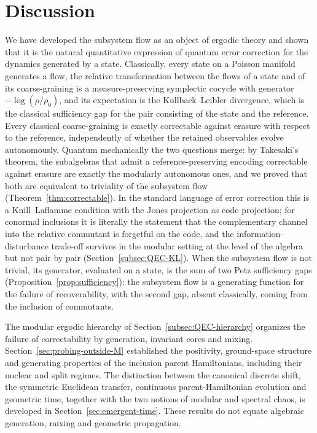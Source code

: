 \documentclass[a4paper,11pt]{article}
\theoremstyle{definition}
\begin{document}
\section{Discussion}\label{sec:discussion}

We have developed the subsystem flow as an object of ergodic theory and shown that it is the natural quantitative expression of quantum error correction for the dynamics generated by a state. Classically, every state on a Poisson manifold generates a flow, the relative transformation between the flows of a state and of its coarse-graining is a measure-preserving symplectic cocycle with generator $-\log(\rho/\rho_0)$, and its expectation is the Kullback--Leibler divergence, which is the classical sufficiency gap for the pair consisting of the state and the reference. Every classical coarse-graining is exactly correctable against erasure with respect to the reference, independently of whether the retained observables evolve autonomously. Quantum mechanically the two questions merge: by Takesaki's theorem, the subalgebras that admit a reference-preserving encoding correctable against erasure are exactly the modularly autonomous ones, and we proved that both are equivalent to triviality of the subsystem flow (Theorem~\ref{thm:correctable}). In the standard language of error correction this is a Knill--Laflamme condition with the Jones projection as code projection; for conormal inclusions it is literally the statement that the complementary channel into the relative commutant is forgetful on the code, and the information--disturbance trade-off survives in the modular setting at the level of the algebra but not pair by pair (Section~\ref{subsec:QEC-KL}). When the subsystem flow is not trivial, its generator, evaluated on a state, is the sum of two Petz sufficiency gaps (Proposition~\ref{prop:sufficiency}): the subsystem flow is a generating function for the failure of recoverability, with the second gap, absent classically, coming from the inclusion of commutants.

The modular ergodic hierarchy of Section~\ref{subsec:QEC-hierarchy}
organizes the failure of correctability by generation, invariant cores and
mixing.  Section~\ref{sec:probing-outside-M} established the positivity,
ground-space structure and generating properties of the inclusion parent
Hamiltonians, including their nuclear and split regimes.  The distinction
between the canonical discrete shift, the symmetric Euclidean transfer,
continuous parent-Hamiltonian evolution and geometric time, together with
the two notions of modular and spectral chaos, is developed in
Section~\ref{sec:emergent-time}. These results do not equate algebraic
generation, mixing and geometric propagation.
\end{document}
